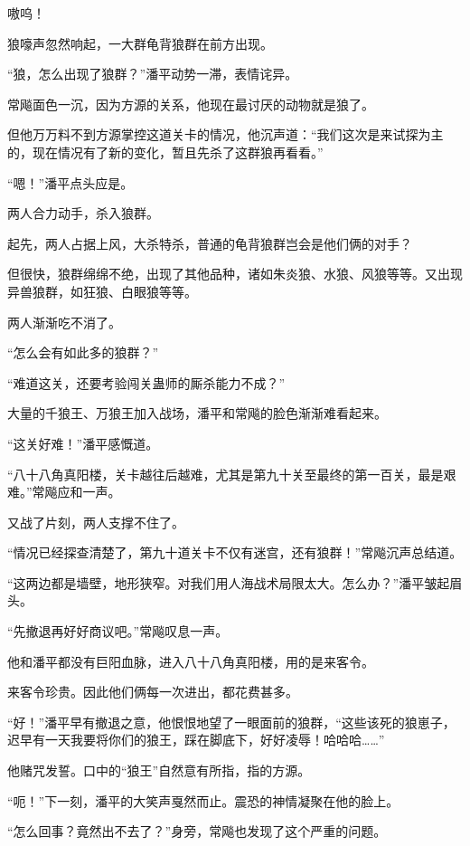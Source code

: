 
\begin{this_body}

嗷呜！

狼嚎声忽然响起，一大群龟背狼群在前方出现。

“狼，怎么出现了狼群？”潘平动势一滞，表情诧异。

常飚面色一沉，因为方源的关系，他现在最讨厌的动物就是狼了。

但他万万料不到方源掌控这道关卡的情况，他沉声道：“我们这次是来试探为主的，现在情况有了新的变化，暂且先杀了这群狼再看看。”

“嗯！”潘平点头应是。

两人合力动手，杀入狼群。

起先，两人占据上风，大杀特杀，普通的龟背狼群岂会是他们俩的对手？

但很快，狼群绵绵不绝，出现了其他品种，诸如朱炎狼、水狼、风狼等等。又出现异兽狼群，如狂狼、白眼狼等等。

两人渐渐吃不消了。

“怎么会有如此多的狼群？”

“难道这关，还要考验闯关蛊师的厮杀能力不成？”

大量的千狼王、万狼王加入战场，潘平和常飚的脸色渐渐难看起来。

“这关好难！”潘平感慨道。

“八十八角真阳楼，关卡越往后越难，尤其是第九十关至最终的第一百关，最是艰难。”常飚应和一声。

又战了片刻，两人支撑不住了。

“情况已经探查清楚了，第九十道关卡不仅有迷宫，还有狼群！”常飚沉声总结道。

“这两边都是墙壁，地形狭窄。对我们用人海战术局限太大。怎么办？”潘平皱起眉头。

“先撤退再好好商议吧。”常飚叹息一声。

他和潘平都没有巨阳血脉，进入八十八角真阳楼，用的是来客令。

来客令珍贵。因此他们俩每一次进出，都花费甚多。

“好！”潘平早有撤退之意，他恨恨地望了一眼面前的狼群，“这些该死的狼崽子，迟早有一天我要将你们的狼王，踩在脚底下，好好凌辱！哈哈哈……”

他赌咒发誓。口中的“狼王”自然意有所指，指的方源。

“呃！”下一刻，潘平的大笑声戛然而止。震恐的神情凝聚在他的脸上。

“怎么回事？竟然出不去了？”身旁，常飚也发现了这个严重的问题。


\end{this_body}
